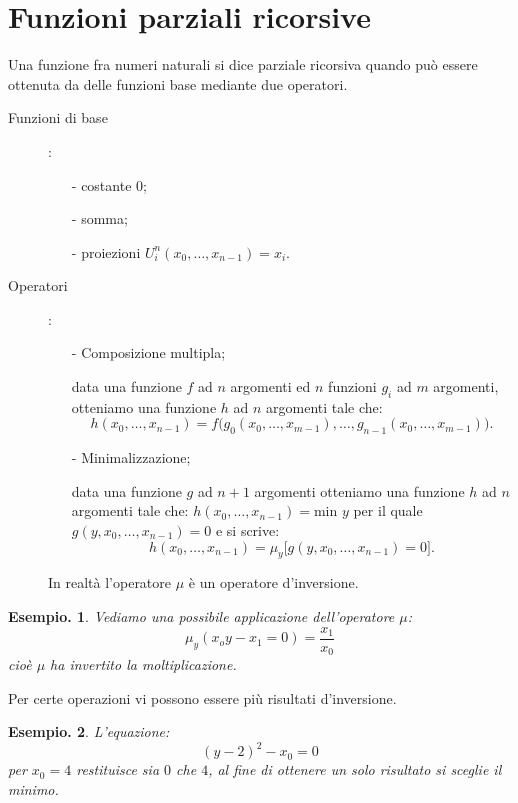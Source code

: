 \documentclass{book}
\newtheorem{esempio}{Esempio.}
\begin{document}
\section{Funzioni parziali ricorsive}
Una funzione fra numeri naturali si dice parziale ricorsiva quando pu\`o essere
 ottenuta da delle funzioni base mediante due operatori.

\begin{description}\item[Funzioni di base]:

\begin{enumerate}
\item[-]costante $0$;
\item[-]somma;
\item[-]proiezioni $U_{i}^{n}(x_0, \ldots  , x_{n-1}) = x_i$.
\end{enumerate} 
\end{description}
\begin{description}
\item[Operatori]:

\begin{enumerate}
\item[-]Composizione multipla;
  \item[]data una funzione $f$ ad $n$ argomenti ed $n$
  funzioni $g_i$ ad $m$ argomenti, otteniamo una funzione $h$  ad $n$ argomenti
  tale che: 
  \[
  h(x_0, \ldots, x_{n-1}) = f\bigr(g_0(x_0, \ldots , x_{m-1}), 
  \ldots, g_{n-1}(x_0, \ldots  , x_{m-1})\bigr).
  \]
\item[-]Minimalizzazione;
  \item[]data una funzione $g$ ad $n+1$ argomenti otteniamo una funzione 
    $h$  ad $n$ argomenti tale che: $h(x_0, \ldots, x_{n-1}) = \text{min } y$ 
    per il quale $g(y, x_0,\ldots , x_{n-1}) = 0$ e si scrive:
    \[
    h(x_0, \ldots, 
    x_{n-1}) = \mu_y \bigl[g(
    y,  x_0, \ldots , x_{n-1}) = 0\bigr].
    \]

\end{enumerate}
In realt\`a l'operatore $\mu$ \`e un operatore d'inversione.
\end{description}
\begin{esempio}Vediamo una possibile applicazione dell'operatore $\mu$:
\[
\mu_y(x_oy - x_1 = 0) = \frac{x_1}{x_0}
\] 
cio\`e $\mu$ ha invertito la moltiplicazione.
\end{esempio}
Per certe operazioni vi possono essere pi\`u risultati d'inversione.
\begin{esempio}L'equazione:
\[
(y-2)^2 - x_0 = 0
\]
per $x_0 = 4$ restituisce sia $0$ che $4$, al fine di ottenere un solo 
risultato si sceglie il minimo.
\end{esempio}
\end{document}
